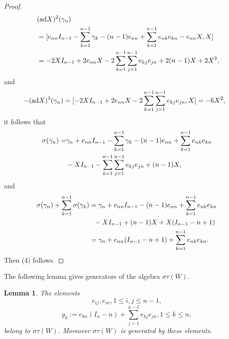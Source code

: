 \documentclass[12pt,a4paper]{amsart}
\newtheorem{lemma}[theorem]{Lemma}%
\numberwithin{equation}{section}
\begin{document}
\begin{proof}
$$\aligned\  & (\mathrm{ad}X)^2(\gamma_n)\\
 &= [ e_{nn}I_{n-1}-\sum_{k=1}^{n-1}\gamma_k-(n-1)e_{nn}+ \sum_{k=1}^{n-1} e_{nk}e_{kn}-e_{nn}X, X]\\
& = -2XI_{n-1}+2e_{nn}X- 2\sum_{k=1}^{n-1}\sum_{j=1}^{n-1} e_{kj}e_{jn}+2(n-1)X
+2X^2,
\endaligned $$
and
$$\aligned\  -(\mathrm{ad}X)^3(\gamma_n)
&=[ -2XI_{n-1}+2e_{nn}X- 2\sum_{k=1}^{n-1}\sum_{j=1}^{n-1} e_{kj}e_{jn},X]= -6X^2,
\endaligned $$
it follows that
$$\aligned \sigma(\gamma_n)=&
\gamma_n+e_{nn}I_{n-1}-\sum_{k=1}^{n-1}\gamma_k-(n-1)e_{nn}+ \sum_{k=1}^{n-1} e_{nk}e_{kn}\\
& -XI_{n-1}- \sum_{k=1}^{n-1}\sum_{j=1}^{n-1} e_{kj}e_{jn}+(n-1)X,
\endaligned $$
and
$$\aligned \sigma(\gamma_n)+\sum_{k=1}^{n-1}\sigma(\gamma_k)& =
\gamma_n+e_{nn}I_{n-1}-(n-1)e_{nn}+ \sum_{k=1}^{n-1} e_{nk}e_{kn}\\
&\ \ -XI_{n-1}+(n-1)X
+X(I_{n-1}-n+1)\\
& =\gamma_n+e_{nn}(I_{n-1}-n+1)+ \sum_{k=1}^{n-1} e_{nk}e_{kn}.
\endaligned $$
Then (4) follows.

\end{proof}

The following lemma gives generators
of the algebra $\sigma\tau(W)$.

\begin{lemma}\label{w-algebra-3.2}
The elements
$$e_{ij}, e_{ni}, 1 \leq i,j \leq n-1,$$
$$ y_k:=e_{kn}(I_{n}-n)
+\sum_{j=1}^{n-1} e_{kj}e_{jn}  , 1 \leq k \leq n,$$
belong to  $\sigma\tau(W)$. Moreover
$\sigma\tau(W)$ is  generated by these elements.
\end{lemma}
\end{document}
